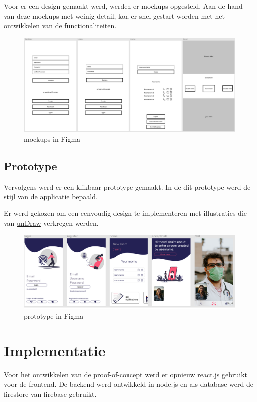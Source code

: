 			Voor er een design gemaakt werd, werden er mockups opgesteld.
			Aan de hand van deze mockups met weinig detail, kon er snel gestart worden met het ontwikkelen van de functionaliteiten. \autocite{Tate2019}
			\begin{figure}[H]
				\centering
				\includegraphics[width=140mm]{./img/mockup-poc.png}{}
				\caption{mockups in Figma}
			\end{figure}
		
		
		\subsection{Prototype}
		
			Vervolgens werd er een klikbaar prototype gemaakt. In de dit prototype werd de stijl van de applicatie bepaald.
			
			Er werd gekozen om een eenvoudig design te implementeren met illustraties die van \href{https://undraw.co/}{unDraw} verkregen werden.
			
			\begin{figure}[H]
				\centering
				\includegraphics[width=140mm]{./img/prototype-poc.png}{}
				\caption{prototype in Figma}
			\end{figure}
			
	
\section{Implementatie}
	Voor het ontwikkelen van de proof-of-concept werd er opnieuw react.js gebruikt voor de frontend. De backend werd ontwikkeld in node.js en als database werd de firestore van firebase gebruikt.
	
